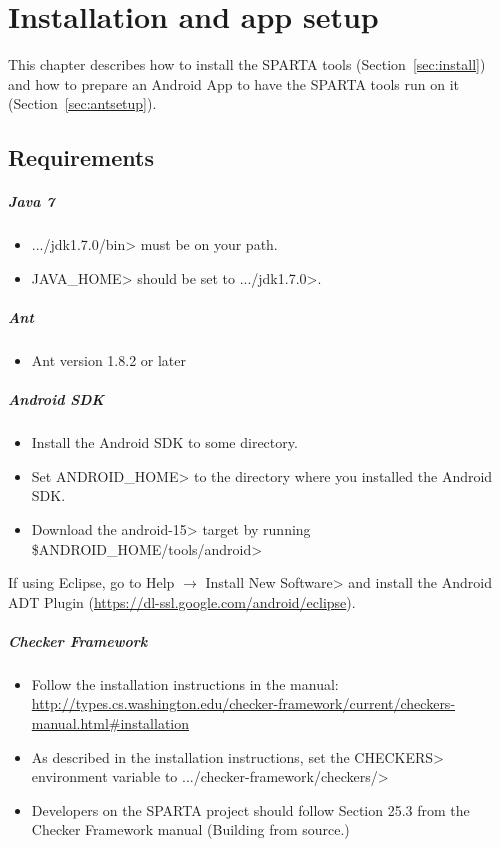 \htmlhr
\chapter{Installation and app setup\label{installation}}
This chapter describes how to install the SPARTA tools
(Section~\ref{sec:install}) and how to prepare an Android App to have the
SPARTA tools run on it (Section~\ref{sec:antsetup}).

\section {Requirements\label{sec:requirements}}
\paragraph{Java 7}
\begin{itemize}
 \item  \<.../jdk1.7.0/bin> must be on your path.
 \item \<JAVA\_HOME> should be set to \<.../jdk1.7.0>.
\end{itemize}

\paragraph{Ant}
\begin{itemize}
 \item Ant version 1.8.2 or later
\end{itemize}

\paragraph{Android SDK}
\begin{itemize}
 \item Install the Android SDK to some directory. 
 \item Set \<ANDROID\_HOME> to the directory where you installed the
   Android SDK.
 \item Download the \<android-15> target by running \<\$ANDROID\_HOME/tools/android>
\end{itemize}

If using Eclipse, go to
\<Help $\rightarrow$ Install New Software>
and install the Android ADT Plugin (\url{https://dl-ssl.google.com/android/eclipse}).

\paragraph{Checker Framework}
\begin{itemize}
\item Follow the installation instructions in the manual: 
\url{http://types.cs.washington.edu/checker-framework/current/checkers-manual.html#installation}
\item As described in the installation instructions, set the \<CHECKERS>
  environment variable to \<.../checker-framework/checkers/>
\item Developers on the SPARTA project should follow Section 25.3 from the Checker Framework manual (Building from source.)
\end{itemize}



